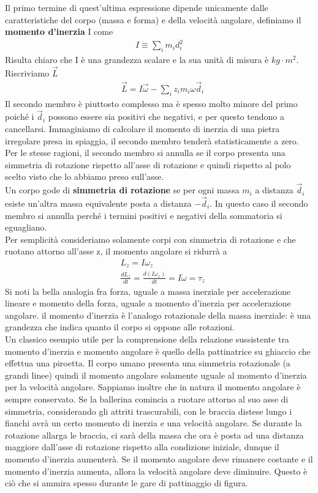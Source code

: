 \documentclass[10pt,a4paper]{article}
\begin{document}
Il primo termine di quest'ultima espressione dipende unicamente dalle caratteristiche del corpo (massa e forma) e della velocità angolare, definiamo il \textbf{momento d'inerzia} I come
\begin{align*}
	I \equiv \sum_i m_i d_i^2
\end{align*}
Risulta chiaro che I è una grandezza scalare e la sua unità di misura è $kg \cdot m^2$. Riscriviamo $\vec{L}$
\begin{align*}
&\vec{L} =  I \vec{\omega} - \sum_i z_i m_i \omega \vec{d}_i 
\end{align*} 
Il secondo membro è piuttosto complesso ma è spesso molto minore del primo poiché i $\vec{d}_i$ possono essere sia positivi che negativi, e per questo tendono a cancellarsi. Immaginiamo di calcolare il momento di inerzia di una pietra irregolare presa in spiaggia, il secondo membro tenderà statisticamente a zero. Per le stesse ragioni, il secondo membro si annulla se il corpo presenta una simmetria di rotazione rispetto all'asse di rotazione e quindi rispetto al polo scelto visto che lo abbiamo preso sull'asse.\\
Un corpo gode di \textbf{simmetria di rotazione} se per ogni massa $m_i$ a distanza $\vec{d}_i$ esiste un'altra massa equivalente posta a distanza $-\vec{d}_i$. In questo caso il secondo membro si annulla perché i termini positivi e negativi della sommatoria si eguagliano.\\
Per semplicità consideriamo solamente corpi con simmetria di rotazione e che ruotano attorno all'asse z, il momento angolare si ridurrà a
\begin{align*}
	&L_z = I \omega_z \\
	&\frac{d L_z}{dt} = \frac{d(I \omega_z)}{dt} = I \dot{\omega} = \tau_z
\end{align*}
Si noti la bella analogia fra forza, uguale a massa inerziale per accelerazione lineare e momento della forza, uguale a momento d'inerzia per accelerazione angolare. il momento d'inerzia è l'analogo rotazionale della massa inerziale: è una grandezza che indica quanto il corpo si oppone alle rotazioni.\\
Un classico esempio utile per la comprensione della relazione sussistente tra momento d'inerzia e momento angolare è quello della pattinatrice su ghiaccio che effettua una piroetta. Il corpo umano presenta una simmetria rotazionale (a grandi linee) quindi il momento angolare solamente uguale al momento d'inerzia per la velocità angolare. Sappiamo inoltre che in natura il momento angolare è sempre conservato. Se la ballerina comincia a ruotare attorno al suo asse di simmetria, considerando gli attriti trascurabili, con le braccia distese lungo i fianchi avrà un certo momento di inerzia e una velocità angolare. Se durante la rotazione allarga le braccia, ci sarà della massa che ora è posta ad una distanza maggiore dall'asse di rotazione rispetto alla condizione iniziale, dunque il momento d'inerzia aumenterà. Se il momento angolare deve rimanere costante e il momento d'inerzia aumenta, allora la velocità angolare deve diminuire. Questo è ciò che si ammira spesso durante le gare di pattinaggio di figura. 
\end{document}
